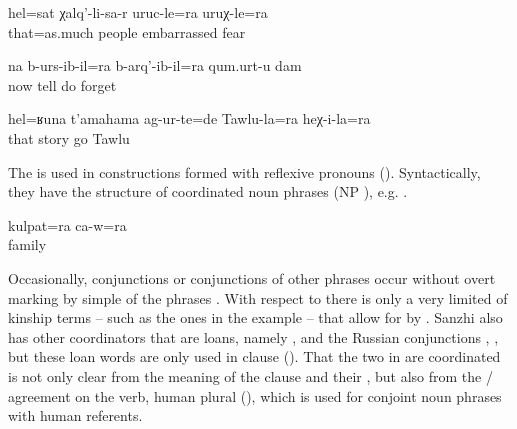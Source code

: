 \begin{exe}
	\ex	\label{ex:‎‎‎as much as being embarrassed and anxious in front of people}
	\gll	hel=sat	χalq'-li-sa-r	uruc-le=ra		uruχ-le=ra\\
		that=as.much	people	embarrassed\tsc{-advz=add}	fear\\
	\glt	{}

	\ex	\label{ex:‎Now I forget what I say and what I do}
	\gll	na	b-urs-ib-il=ra	b-arq'-ib-il=ra	qum.urt-u	dam\\
		now	tell do	forget	\\
	\glt	{}

	\ex	\label{ex:‎Such a story happened to Tawlu and him}
	\gll	hel=ʁuna	t'amahama	ag-ur-te=de	Tawlu-la=ra	heχ-i-la=ra\\
		that	story	go	Tawlu	\\
	\glt	{}
\end{exe}

The  is used in  constructions formed with reflexive pronouns (). Syntactically, they have the structure of coordinated noun phrases (NP ), e.g. .

\begin{exe}
	\ex	\label{ex:with his family}
	\gll	kulpat=ra ca-w=ra\\
		family	\\
	\glt	{}
\end{exe}

Occasionally,  conjunctions or conjunctions of other phrases occur without overt marking by simple  of the phrases . With respect to  there is only a very limited  of kinship terms – such as the ones in the example  – that allow for  by . Sanzhi also has other coordinators that are loans, namely  , and the Russian conjunctions  ,  , but these loan words are only used in clause  (). That the two  in  are coordinated is not only clear from the meaning of the clause and their , but also from the / agreement on the verb, human plural (), which is used for conjoint noun phrases with human referents.

